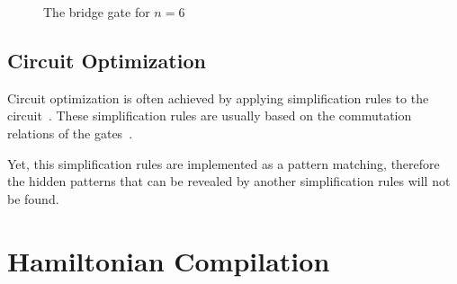 \documentclass{report}
\begin{document}
\def\qceq{\midstick[6,brackets=none]{=}}
\begin{figure}[h]
  \centering
{}
  \caption{The bridge gate for $n=6$}
\end{figure}

\subsection{Circuit Optimization}

Circuit optimization is often achieved by applying simplification rules to the circuit~\cite{pointing2021}. These simplification rules are usually based on the commutation relations of the gates~\cite{itoko2019}.

Yet, this simplification rules are implemented as a pattern matching, therefore the hidden patterns that can be revealed by another simplification rules will not be found.

\section{Hamiltonian Compilation}
\end{document}
